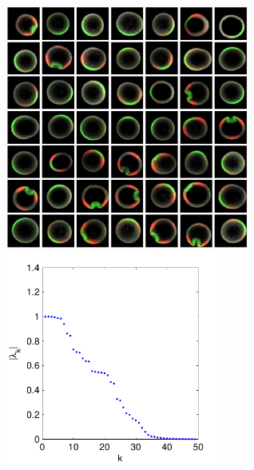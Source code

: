 \documentclass[12pt]{article}
\begin{document}
\begin{figure}[H]
\includegraphics[width=8cm]{raw_data1}
\hfill
{}
\includegraphics[width=7cm]{FBsPCA_evals}


\end{figure}
\end{document}
